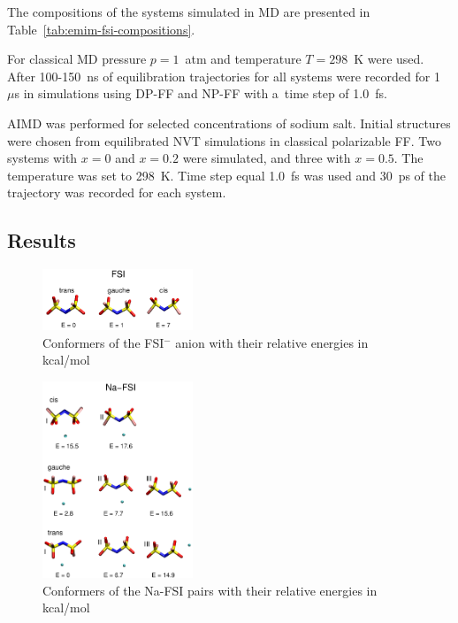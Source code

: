 The compositions of the systems simulated in MD are presented in Table~\ref{tab:emim-fsi-compositions}.

For classical MD pressure $p = 1$~atm and temperature $T = 298$~K were used. After 100-150~ns of equilibration trajectories for all systems were recorded for 1~$\mu$s in simulations using DP-FF and NP-FF with a~time step of 1.0~fs.

AIMD was performed for selected concentrations of sodium salt. Initial structures were chosen from equilibrated NVT simulations in classical polarizable FF. Two systems with $x = 0$ and $x = 0.2$ were simulated, and three with $x = 0.5$. The temperature was set to 298~K. Time step equal 1.0~fs was used and 30~ps of the trajectory was recorded for each system.

\subsection{Results}

\begin{figure}[ht]
    \centering
    \includegraphics[width=0.4\textwidth]{img/3-structural-data-from-md-simulations/1-emim-fsi/conformers/fsi-conformers.png}
    \caption{Conformers of the FSI$^{-}$ anion with their relative energies in kcal/mol}
    \label{fig:emim-fsi-fsi-conformers}
\end{figure}

\begin{figure}[ht]
    \centering
    \includegraphics[width=0.4\textwidth]{img/3-structural-data-from-md-simulations/1-emim-fsi/conformers/na-fsi-conformers.png}
    \caption{Conformers of the Na-FSI pairs with their relative energies in kcal/mol}
    \label{fig:emim-fsi-na-fsi-conformers}
\end{figure}

